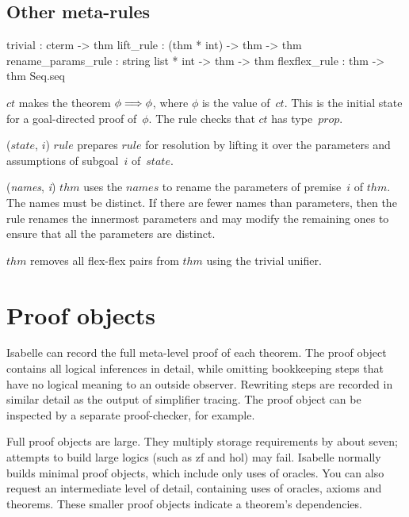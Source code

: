 \subsection{Other meta-rules}
\begin{ttbox} 
trivial            : cterm -> thm
lift_rule          : (thm * int) -> thm -> thm
rename_params_rule : string list * int -> thm -> thm
flexflex_rule      : thm -> thm Seq.seq
\end{ttbox}
\begin{ttdescription}
\item[\ttindexbold{trivial} $ct$] 
makes the theorem \(\phi\Longrightarrow\phi\), where $\phi$ is the value of~$ct$.
This is the initial state for a goal-directed proof of~$\phi$.  The rule
checks that $ct$ has type~$prop$.

\item[\ttindexbold{lift_rule} ($state$, $i$) $rule$] 
prepares $rule$ for resolution by lifting it over the parameters and
assumptions of subgoal~$i$ of~$state$.

\item[\ttindexbold{rename_params_rule} ({\it names}, {\it i}) $thm$] 
uses the $names$ to rename the parameters of premise~$i$ of $thm$.  The
names must be distinct.  If there are fewer names than parameters, then the
rule renames the innermost parameters and may modify the remaining ones to
ensure that all the parameters are distinct.

\item[\ttindexbold{flexflex_rule} $thm$]  
removes all flex-flex pairs from $thm$ using the trivial unifier.
\end{ttdescription}


\section{Proof objects}\label{sec:proofObjects}
 Isabelle can record the full meta-level proof of each
theorem.  The proof object contains all logical inferences in detail, while
omitting bookkeeping steps that have no logical meaning to an outside
observer.  Rewriting steps are recorded in similar detail as the output of
simplifier tracing.  The proof object can be inspected by a separate
proof-checker, for example.

Full proof objects are large.  They multiply storage requirements by about
seven; attempts to build large logics (such as {\sc zf} and {\sc hol}) may
fail.  Isabelle normally builds minimal proof objects, which include only uses
of oracles.  You can also request an intermediate level of detail, containing
uses of oracles, axioms and theorems.  These smaller proof objects indicate a
theorem's dependencies.

